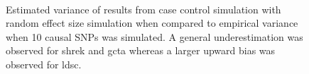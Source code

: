 \begin{figure}
{				\label{fig:gctaCC10RandVarCom}
			}\\
			\caption[Estimation of Variance in Case Control Simulation (10 Causal)]
			{Estimated variance of results from case control simulation with random effect size simulation when compared to empirical variance when 10 causal \glspl{SNP} was simulated.
				A general underestimation was observed for \gls{shrek} and \gls{gcta} whereas a larger upward bias was observed for \gls{ldsc}.} 
			\label{fig:CC10RandVarCom}
		\end{figure}